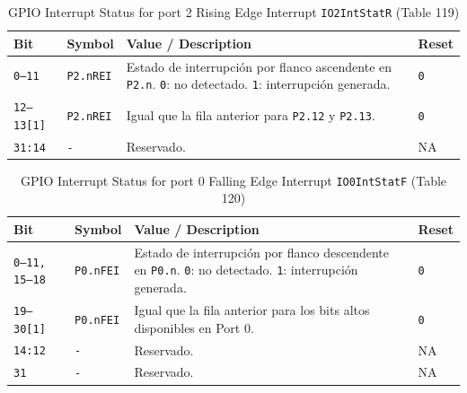 \begin{table}[H]
  \centering
  \small
  \caption{GPIO Interrupt Status for port 2 Rising Edge Interrupt \texttt{IO2IntStatR} (Table 119)}
  \begin{tabularx}{0.96\textwidth}{|>{\centering\arraybackslash}p{}|>{\raggedright\arraybackslash}p{}|>{\raggedright\arraybackslash}X|>{\centering\arraybackslash}p{}|}
    \hline
    \textbf{Bit} & \textbf{Symbol} & \textbf{Value / Description} & \textbf{Reset} \\
    \hline
    \texttt{0--11} & \texttt{P2.nREI} & Estado de interrupción por flanco ascendente en \texttt{P2.n}. \texttt{0}: no detectado. \texttt{1}: interrupción generada. & \texttt{0} \\
    \hline
    \texttt{12--13[1]} & \texttt{P2.nREI} & Igual que la fila anterior para \texttt{P2.12} y \texttt{P2.13}. & \texttt{0} \\
    \hline
    \texttt{31:14} & \texttt{-} & Reservado. & NA \\
    \hline
  \end{tabularx}
\end{table}

\begin{table}[H]
  \centering
  \small
  \caption{GPIO Interrupt Status for port 0 Falling Edge Interrupt \texttt{IO0IntStatF} (Table 120)}
  \begin{tabularx}{0.96\textwidth}{|>{\centering\arraybackslash}p{}|>{\raggedright\arraybackslash}p{}|>{\raggedright\arraybackslash}X|>{\centering\arraybackslash}p{}|}
    \hline
    \textbf{Bit} & \textbf{Symbol} & \textbf{Value / Description} & \textbf{Reset} \\
    \hline
    \texttt{0--11, 15--18} & \texttt{P0.nFEI} & Estado de interrupción por flanco descendente en \texttt{P0.n}. \texttt{0}: no detectado. \texttt{1}: interrupción generada. & \texttt{0} \\
    \hline
    \texttt{19--30[1]} & \texttt{P0.nFEI} & Igual que la fila anterior para los bits altos disponibles en Port 0. & \texttt{0} \\
    \hline
    \texttt{14:12} & \texttt{-} & Reservado. & NA \\
    \hline
    \texttt{31} & \texttt{-} & Reservado. & NA \\
    \hline
  \end{tabularx}
\end{table}


